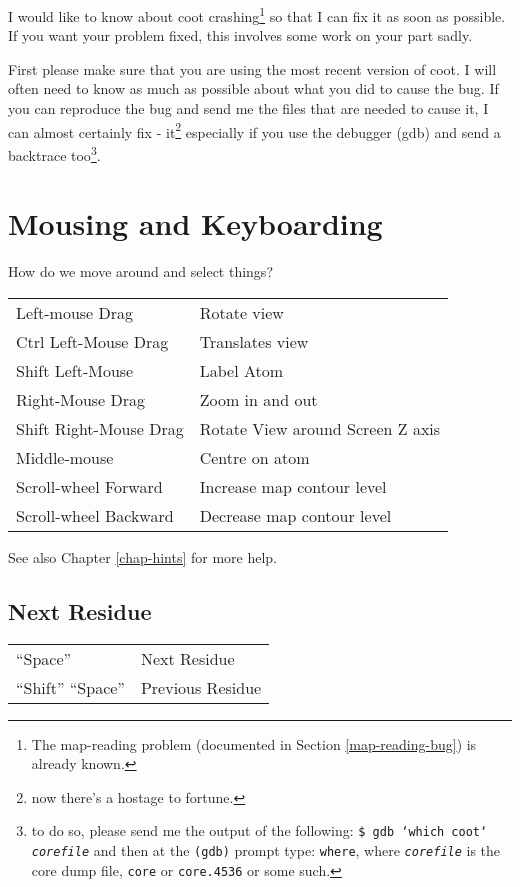\documentclass{book}
\begin{document}
I would like to know about coot crashing\footnote{The map-reading
  problem (documented in Section \ref{map-reading-bug}) is already
  known.} so that I can fix it as soon as possible. If you want your
problem fixed, this involves some work on your part sadly.

First please make sure that you are using the most recent version of
coot.  I will often need to know as much as possible about what you
did to cause the bug.  If you can reproduce the bug and send me the
files that are needed to cause it, I can almost certainly fix -
it\footnote{now there's a hostage to fortune.} especially if you
use the debugger (gdb) and send a backtrace
too\footnote{to do so, please send me the output of the following:
  \texttt{\$ gdb `which coot` \emph{corefile}} and then at the
  \texttt{(gdb)} prompt type: \texttt{where}, where
  \texttt{\emph{corefile}} is the core dump file, \texttt{core} or
  \texttt{core.4536} or some such.}.

\chapter{Mousing and Keyboarding}
How do we move around and select things?

\vspace{0.5cm}
  \begin{tabular}{ll}
    Left-mouse Drag & Rotate view \\
    Ctrl Left-Mouse Drag &  Translates view \\
    Shift Left-Mouse &  Label Atom\\
    Right-Mouse Drag &  Zoom in and out\index{zoom}\\
    Shift Right-Mouse Drag &  Rotate View around Screen Z axis\\
    Middle-mouse & Centre on atom\\
    Scroll-wheel Forward &  Increase map contour level\\
    Scroll-wheel Backward &  Decrease map contour level
  \end{tabular}
\vspace{3mm}

See also Chapter \ref{chap-hints} for more help.

\section{Next Residue}
\begin{tabular}{ll}
  ``Space'' & Next Residue \\
  ``Shift'' ``Space'' & Previous Residue
\end{tabular}
\end{document}
